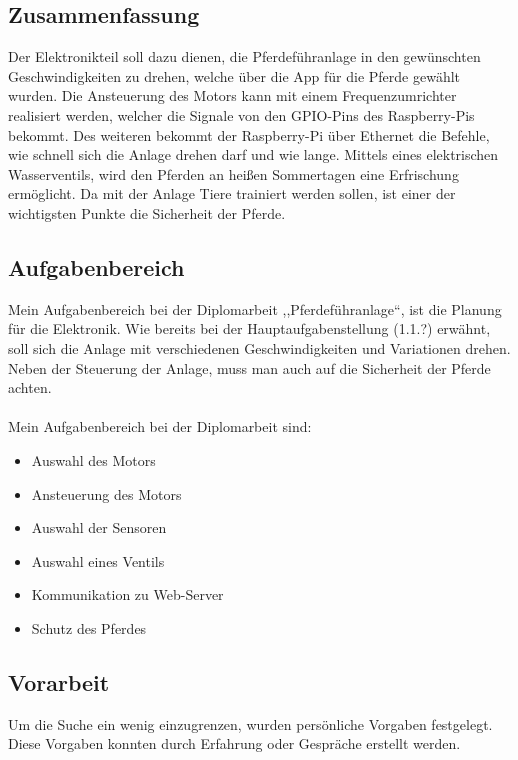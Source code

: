 \documentclass[12pt]{scrartcl}
\begin{document}
\subsection{Zusammenfassung}
\label{sec:zusammenfassung}

Der Elektronikteil soll dazu dienen, die Pferdeführanlage in den gewünschten Geschwindigkeiten zu drehen, welche über die App für die Pferde gewählt wurden. 
Die Ansteuerung des Motors kann mit einem Frequenzumrichter realisiert werden, 
welcher die Signale von den GPIO-Pins des Raspberry-Pis bekommt.
Des weiteren bekommt der Raspberry-Pi über Ethernet die Befehle, wie schnell sich die Anlage drehen darf und wie lange. 
Mittels eines elektrischen Wasserventils, wird den Pferden an heißen Sommertagen eine Erfrischung ermöglicht. 
Da mit der Anlage Tiere trainiert werden sollen, ist einer der wichtigsten Punkte die Sicherheit der Pferde.

\subsection{Aufgabenbereich}
\label{sec:aufgabenbereich}

Mein Aufgabenbereich bei der Diplomarbeit ,,Pferdeführanlage“, ist die Planung für die Elektronik. Wie bereits bei der Hauptaufgabenstellung (1.1.?) erwähnt, 
soll sich die Anlage mit verschiedenen Geschwindigkeiten und Variationen drehen.  Neben der Steuerung der Anlage, muss man auch auf die Sicherheit der Pferde achten.
\\
\\
Mein Aufgabenbereich bei der Diplomarbeit sind:

\begin{itemize}
\item Auswahl des Motors
\item Ansteuerung des Motors
\item Auswahl der Sensoren
\item Auswahl eines Ventils
\item Kommunikation zu Web-Server
\item Schutz des Pferdes
\end{itemize}
\newpage
\subsection{Vorarbeit}
\label{sec:vorarbeit}

Um die Suche ein wenig einzugrenzen, wurden persönliche Vorgaben festgelegt.
Diese Vorgaben konnten durch Erfahrung oder Gespräche erstellt werden.
\end{document}
